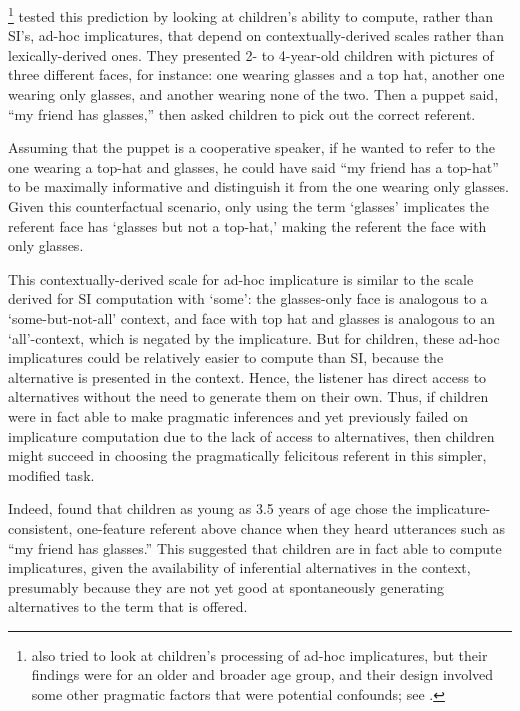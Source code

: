 \documentclass[10pt,letterpaper]{article}
\begin{document}
\footnote{ also tried to look at children's processing of ad-hoc implicatures, but their findings were for an older and broader age group, and their design involved some other pragmatic factors that were potential confounds; see .} tested this prediction by looking at children's ability to compute, rather than SI's, ad-hoc implicatures, that depend on contextually-derived scales rather than lexically-derived ones. They presented 2- to 4-year-old children with pictures of three different faces, for instance: one wearing glasses and a top hat, another one wearing only glasses, and another wearing none of the two. Then a puppet said, ``my friend has glasses,'' then asked children to pick out the correct referent.

Assuming that the puppet is a cooperative speaker, if he wanted to refer to the one wearing a top-hat and glasses, he could have said ``my friend has a top-hat'' to be maximally informative and distinguish it from the one wearing only glasses. Given this counterfactual scenario, only using the term `glasses' implicates the referent face has `glasses but not a top-hat,' making the referent the face with only glasses. 

This contextually-derived scale for ad-hoc implicature is similar to the scale derived for SI computation with `some': the glasses-only face is analogous to a `some-but-not-all' context, and face with top hat and glasses is analogous to an `all'-context, which is negated by the implicature. But for children, these ad-hoc implicatures could be relatively easier to compute than SI, because the alternative is presented in the context. Hence, the listener has direct access to alternatives without the need to generate them on their own. Thus, if children were in fact able to make pragmatic inferences and yet previously failed on implicature computation due to the lack of access to alternatives, then children might succeed in choosing the pragmatically felicitous referent in this simpler, modified task. 

Indeed,  found that children as young as 3.5 years of age chose the implicature-consistent, one-feature referent above chance when they heard utterances such as ``my friend has glasses.'' This suggested that children are in fact able to compute implicatures, given the availability of inferential alternatives in the context, presumably because they are not yet good at spontaneously generating alternatives to the term that is offered. 
\end{document}
